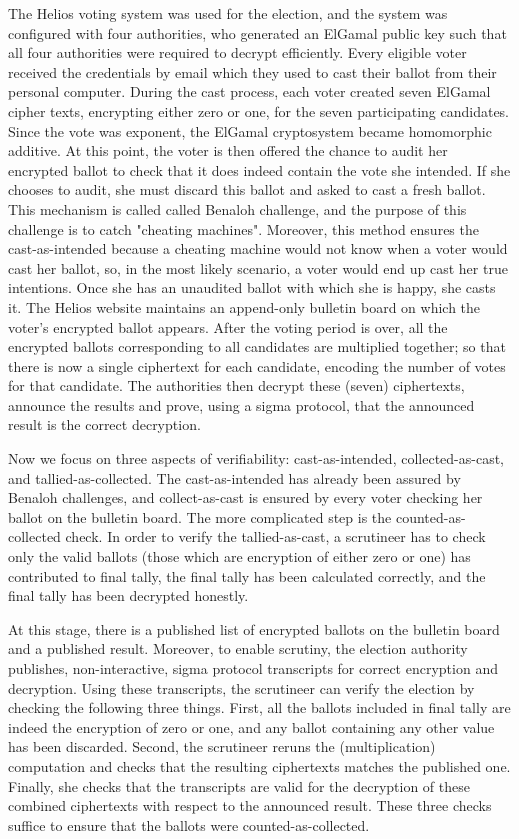 The Helios voting system \citep{Helios:2016:HVS}  was used for the election, and the system
was configured with four authorities, who generated an ElGamal \citep{elgamal1985public}  public
key such that all four authorities were required to decrypt efficiently.    
Every eligible voter received the credentials by email which they used 
to cast their ballot from their personal computer. 
During the cast process, each voter created seven ElGamal cipher texts, 
encrypting either zero or one, for the seven participating candidates. 
Since the vote was exponent, the ElGamal cryptosystem became 
homomorphic additive. At this point,  the voter is then offered the chance to audit 
her encrypted ballot to check that
it does indeed contain the vote she intended. If she chooses to audit, she must
discard this ballot and asked to  cast 
a fresh ballot. This mechanism is called called Benaloh challenge, 
and the purpose of this challenge is to catch "cheating machines". 
Moreover, this method ensures the cast-as-intended because 
a cheating machine would not know when a voter would 
cast her ballot, so, in the most likely scenario, a voter would 
end up cast her true intentions. Once she has an 
unaudited ballot with which she is happy, she casts it. 
The Helios website maintains an append-only bulletin board on which the voter's
encrypted ballot appears.  
After the voting period is over,
all the encrypted ballots corresponding to all candidates are multiplied together; so that there is 
now a single ciphertext for each candidate, encoding the number of votes for
that candidate.  The authorities then decrypt 
these (seven) ciphertexts, announce the results and prove,
using a sigma protocol, that the announced result is the 
correct decryption.


Now we focus on three aspects of verifiability: cast-as-intended, collected-as-cast, 
and tallied-as-collected. The cast-as-intended has already been assured 
by Benaloh challenges, and collect-as-cast is ensured by every voter 
checking her ballot on the bulletin board. 
The more complicated step is the counted-as-collected
check.  In order to verify the tallied-as-cast, a scrutineer has to check 
only the valid ballots (those which are encryption of either zero or one) 
has contributed to final tally, the final tally has been calculated 
correctly, and the final tally has been decrypted honestly. 

At this stage, there is a published list of encrypted ballots on the bulletin board
and a published result.  Moreover, to enable scrutiny, the election authority publishes, 
non-interactive, sigma protocol transcripts for correct encryption and decryption. 
Using these transcripts,  the scrutineer can verify the election by checking the following
three things. First, all the ballots included in final tally are indeed the encryption of 
zero or one, and any ballot containing any other value has been discarded. 
Second, the scrutineer reruns the (multiplication)
computation and checks that the resulting ciphertexts matches the published one.
Finally, she checks that the transcripts are valid for the decryption of these
combined ciphertexts with respect to the announced result.  These  three checks
suffice to ensure that the ballots were counted-as-collected. 


